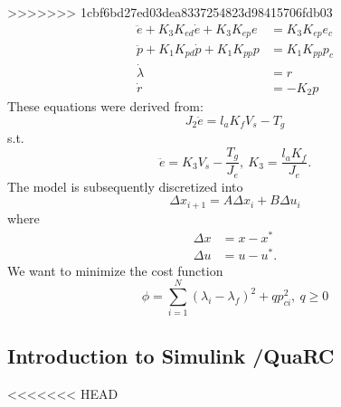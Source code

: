 >>>>>>> 1cbf6bd27ed03dea8337254823d98415706fdb03
\begin{subequations}
\label{eq:model_al}
\begin{align}
	\ddot{e} + K_{3} K_{ed} \dot{e} + K_{3} K_{ep} e &= K_{3} K_{ep} e_{c} \label{eq:model_se_al_elev} \\
	\ddot{p} + K_{1} K_{pd} \dot{p} + K_{1} K_{pp} p &= K_{1} K_{pp} p_{c} \label{eq:model_se_al_pitch} \\
	\dot{\lambda} &= r \label{eq:model_se_al_lambda} \\
	\dot{r} &= -K_{2} p \label{eq:model_se_al_r} 
\end{align}
\end{subequations}
These equations were derived from: 
\begin{equation}
	J_{2} \ddot{e} = l_{a} K_{f} V_{s} - T_{g}
	\end{equation}
s.t.
\begin{equation*}
\ddot{e}=K_{3} V_{s}-\frac{T_{g}}{J_{e}},\: K_{3}=\frac{l_{a}K_{f}}{J_{e}}.
\end{equation*}
The model is subsequently discretized into
\begin{equation*}
\Delta x_{i+1}=A\Delta x_{i} + B\Delta u_{i}
\end{equation*} 	
where
\begin{align}
\Delta x &= x -x^* \\
\Delta u &= u -u^*.
\end{align}
We want to minimize the cost function 
\begin{equation}
\phi = \sum_{i=1}^{N}(\lambda_{i}-\lambda_{f})^2+qp_{ci}^{2},\:q\geq 0
\end{equation}
\subsection{Introduction to Simulink /QuaRC}
<<<<<<< HEAD

